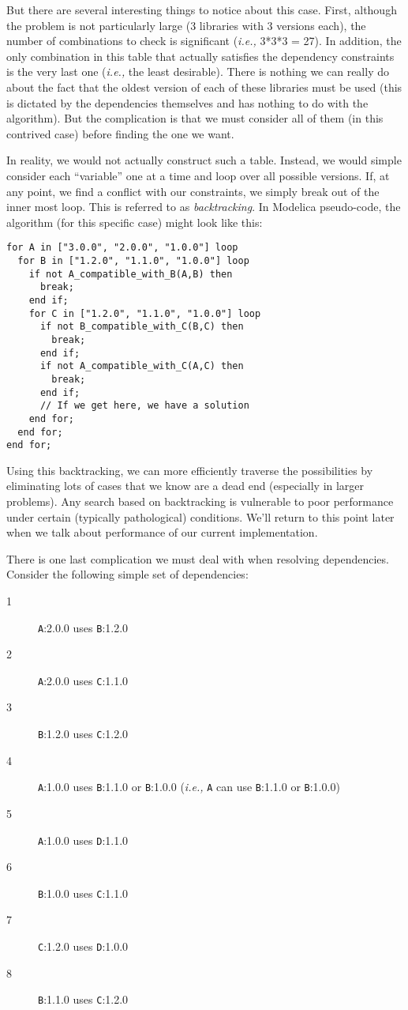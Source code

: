 \documentclass[11pt,a4paper,twocolumn]{article}
\newcommand{\code}[1]{\texttt{#1}} %
\begin{document}
But there are several interesting things to notice about this case.
First, although the problem is not particularly large (3 libraries
with 3 versions each), the number of combinations to check is
significant ({\it i.e.,} 3*3*3 = 27).  In addition, the only
combination in this table that actually satisfies the dependency
constraints is the very last one ({\it i.e.,} the least desirable).
There is nothing we can really do about the fact that the oldest
version of each of these libraries must be used (this is dictated by
the dependencies themselves and has nothing to do with the algorithm).
But the complication is that we must consider all of them (in this
contrived case) before finding the one we want.

In reality, we would not actually construct such a table.  Instead, we
would simple consider each ``variable'' one at a time and loop over
all possible versions.  If, at any point, we find a conflict with our
constraints, we simply break out of the inner most loop.  This is
referred to as {\em backtracking}.  In Modelica pseudo-code, the
algorithm (for this specific case) might look like this:

\begin{verbatim}
for A in ["3.0.0", "2.0.0", "1.0.0"] loop
  for B in ["1.2.0", "1.1.0", "1.0.0"] loop
    if not A_compatible_with_B(A,B) then
      break;
    end if;
    for C in ["1.2.0", "1.1.0", "1.0.0"] loop
      if not B_compatible_with_C(B,C) then
        break;
      end if;
      if not A_compatible_with_C(A,C) then
        break;
      end if;
      // If we get here, we have a solution
    end for;
  end for;
end for;
\end{verbatim}

Using this backtracking, we can more efficiently traverse the
possibilities by eliminating lots of cases that we know are a dead
end (especially in larger problems).  Any search based on backtracking
is vulnerable to poor performance under certain (typically
pathological) conditions.  We'll return to this point later when we
talk about performance of our current implementation.

There is one last complication we must deal with when resolving
dependencies.  Consider the following simple set of dependencies:

\begin{description}
  \item[1] {\code A:2.0.0} uses {\code B:1.2.0}
  \item[2] {\code A:2.0.0} uses {\code C:1.1.0}
  \item[3] {\code B:1.2.0} uses {\code C:1.2.0}
  \item[4] {\code A:1.0.0} uses {\code B:1.1.0} or {\code B:1.0.0} ({\it i.e.,} {\code A}
    can use {\code B:1.1.0} or {\code B:1.0.0})
  \item[5] {\code A:1.0.0} uses {\code D:1.1.0}
  \item[6] {\code B:1.0.0} uses {\code C:1.1.0}
  \item[7] {\code C:1.2.0} uses {\code D:1.0.0}
  \item[8] {\code B:1.1.0} uses {\code C:1.2.0}
\end{description}
\end{document}
